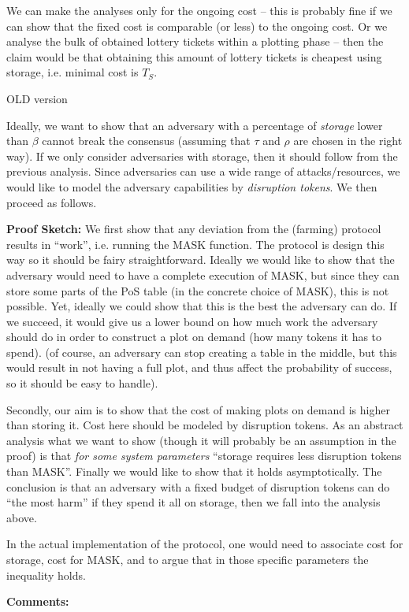 \documentclass[12pt,draftcls,onecolumn]{IEEEtran}
\begin{document}
We can make the analyses only for the ongoing cost -- this is probably fine if we can show that the fixed cost is comparable (or less) to the ongoing cost. Or we analyse the bulk of obtained lottery tickets within a plotting phase -- then the claim would be that obtaining this amount of lottery tickets is cheapest using storage, i.e. minimal cost is $T_S$.



OLD version

Ideally, we want to show that an adversary with a percentage of \emph{storage} lower than $\beta$ cannot break the consensus (assuming that $\tau$ and $\rho$ are chosen in the right way). If we only consider adversaries with storage, then it should follow from the previous analysis. Since adversaries can use a wide range of attacks/resources, we would like to model the adversary capabilities by \emph{disruption tokens}. We then proceed as follows.

{\bf Proof Sketch:} We first show that any deviation from the (farming) protocol results in ``work'', i.e. running the MASK function. The protocol is design this way so it should be fairy straightforward. Ideally we would like to show that the adversary would need to have a complete execution of MASK, but since they can store some parts of the PoS table (in the concrete choice of MASK), this is not possible. Yet, ideally we could show that this is the best the adversary can do. If we succeed, it would give us a lower bound on how much work the adversary should do in order to construct a plot on demand (how many tokens it has to spend). (of course, an adversary can stop creating a table in the middle, but this would result in not having a full plot, and thus affect the probability of success, so it should be easy to handle).

Secondly, our aim is to show that the cost of making plots on demand is higher than storing it. Cost here should be modeled by disruption tokens. As an abstract analysis what we want to show (though it will probably be an assumption in the proof) is that \emph{for some system parameters} ``storage requires less disruption tokens than MASK''.  Finally we would like to show that it holds asymptotically. The conclusion is that an adversary with a fixed budget of disruption tokens can do ``the most harm'' if they spend it all on storage, then we fall into the analysis above.

In the actual implementation of the protocol, one would need to associate cost for storage, cost for MASK, and to argue that in those specific parameters the inequality holds.

{\bf Comments:} 
\end{document}
